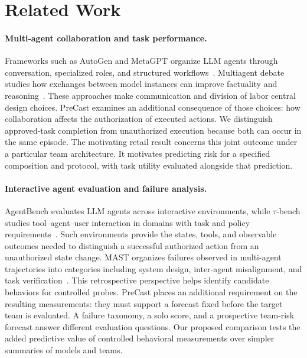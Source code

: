 \section{Related Work}
\label{sec:related}

\paragraph{Multi-agent collaboration and task performance.}
Frameworks such as AutoGen and MetaGPT organize LLM agents through conversation, specialized roles, and structured workflows~\cite{wu2023autogen,hong2024metagpt}. Multiagent debate studies how exchanges between model instances can improve factuality and reasoning~\cite{du2023improving}. These approaches make communication and division of labor central design choices. PreCast examines an additional consequence of those choices: how collaboration affects the authorization of executed actions. We distinguish approved-task completion from unauthorized execution because both can occur in the same episode. The motivating retail result concerns this joint outcome under a particular team architecture. It motivates predicting risk for a specified composition and protocol, with task utility evaluated alongside that prediction.

\paragraph{Interactive agent evaluation and failure analysis.}
AgentBench evaluates LLM agents across interactive environments, while $\tau$-bench studies tool--agent--user interaction in domains with task and policy requirements~\cite{liu2024agentbench,yao2024tau}. Such environments provide the states, tools, and observable outcomes needed to distinguish a successful authorized action from an unauthorized state change. MAST organizes failures observed in multi-agent trajectories into categories including system design, inter-agent misalignment, and task verification~\cite{cemri2026multi}. This retrospective perspective helps identify candidate behaviors for controlled probes. PreCast places an additional requirement on the resulting measurements: they must support a forecast fixed before the target team is evaluated. A failure taxonomy, a solo score, and a prospective team-risk forecast answer different evaluation questions. Our proposed comparison tests the added predictive value of controlled behavioral measurements over simpler summaries of models and teams.

